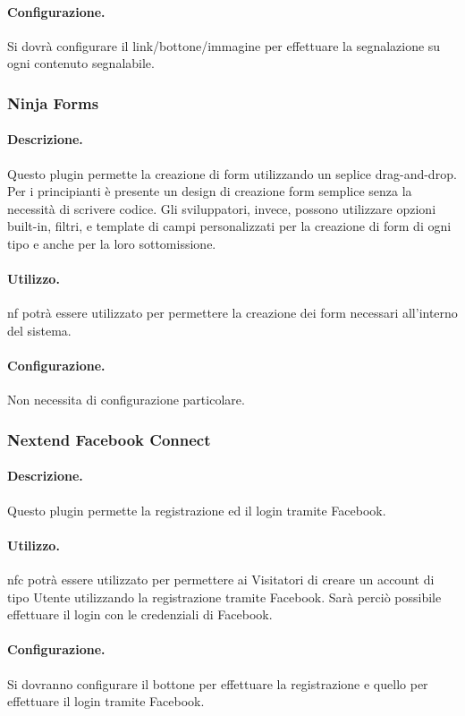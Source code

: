 \paragraph{Configurazione.} Si dovrà configurare il link/bottone/immagine per effettuare la segnalazione su ogni contenuto segnalabile.

\subsubsection{Ninja Forms} \label{plugin:nf}
\paragraph{Descrizione.} Questo plugin permette la creazione di form utilizzando un seplice drag-and-drop. Per i principianti è presente un design di creazione form semplice senza la necessità di scrivere codice. Gli sviluppatori, invece, possono utilizzare opzioni built-in, filtri, e template di campi personalizzati per la creazione di form di ogni tipo e anche per la loro sottomissione.
\paragraph{Utilizzo.} \gls{nf} potrà essere utilizzato per permettere la creazione dei form necessari all'interno del sistema.
\paragraph{Configurazione.} Non necessita di configurazione particolare.

\subsubsection{Nextend Facebook Connect} \label{plugin:nfc}
\paragraph{Descrizione.} Questo plugin permette la registrazione ed il login tramite Facebook.
\paragraph{Utilizzo.} \gls{nfc} potrà essere utilizzato per permettere ai Visitatori di creare un account di tipo Utente utilizzando la registrazione tramite Facebook. Sarà perciò possibile effettuare il login con le credenziali di Facebook.
\paragraph{Configurazione.} Si dovranno configurare il bottone per effettuare la registrazione e quello per effettuare il login tramite Facebook.

